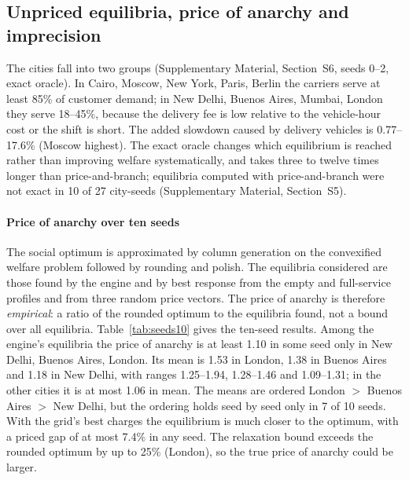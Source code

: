 \documentclass[preprint,11pt]{elsarticle}
\theoremstyle{definition}
\theoremstyle{remark}
\newcommand{\SM}[1]{Supplementary Material, Section~#1}
\begin{document}
\subsection{Unpriced equilibria, price of anarchy and imprecision}\label{sec:res-eq}\label{sec:res-poa}\label{sec:res-engine}

The cities fall into two groups (\SM{S6}, seeds 0--2, exact oracle). In Cairo, Moscow, New York, Paris, Berlin the carriers serve at least 85\% of customer demand; in New Delhi, Buenos Aires, Mumbai, London they serve 18--45\%, because the delivery fee is low relative to the vehicle-hour cost or the shift is short. The added slowdown caused by delivery vehicles is 0.77--17.6\% (Moscow highest). The exact oracle changes which equilibrium is reached rather than improving welfare systematically, and takes three to twelve times longer than price-and-branch; equilibria computed with price-and-branch were not exact in 10 of 27 city-seeds (\SM{S5}).

\paragraph{Price of anarchy over ten seeds} The social optimum is approximated by column generation on the convexified welfare problem followed by rounding and polish. The equilibria considered are those found by the engine and by best response from the empty and full-service profiles and from three random price vectors. The price of anarchy is therefore \emph{empirical}: a ratio of the rounded optimum to the equilibria found, not a bound over all equilibria. Table~\ref{tab:seeds10} gives the ten-seed results. Among the engine's equilibria the price of anarchy is at least 1.10 in some seed only in New Delhi, Buenos Aires, London. Its mean is 1.53 in London, 1.38 in Buenos Aires and 1.18 in New Delhi, with ranges 1.25--1.94, 1.28--1.46 and 1.09--1.31; in the other cities it is at most 1.06 in mean. The means are ordered London $>$ Buenos Aires $>$ New Delhi, but the ordering holds seed by seed only in 7 of 10 seeds. With the grid's best charges the equilibrium is much closer to the optimum, with a priced gap of at most 7.4\% in any seed. The relaxation bound exceeds the rounded optimum by up to 25\% (London), so the true price of anarchy could be larger.
\end{document}
